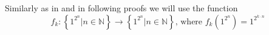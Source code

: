 \documentclass{llncs}
\begin{document}
Similarly as in \citep{Macarie1995} and \citep{Monien1980} in following proofs we will use the function
\[
	f_k : \left\{ 1^{2^n} | n \in \mathbb{N} \right\} \rightarrow \left\{ 1^{2^n} | n \in \mathbb{N} \right\} \textrm{, where } f_k( 1^{2^n}) = 1^{2^{k \cdot n}}
\]

{}


\end{document}
